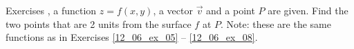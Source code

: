 {\noindent Exercises}
{, a function $z=f(x,y)$, a vector $\vec v$ and a point $P$ are given. Find the two points that are 2 units from the surface $f$ at $P$. Note: these are the same functions as in  Exercises \ref{12_06_ex_05} -- \ref{12_06_ex_08}.
}
